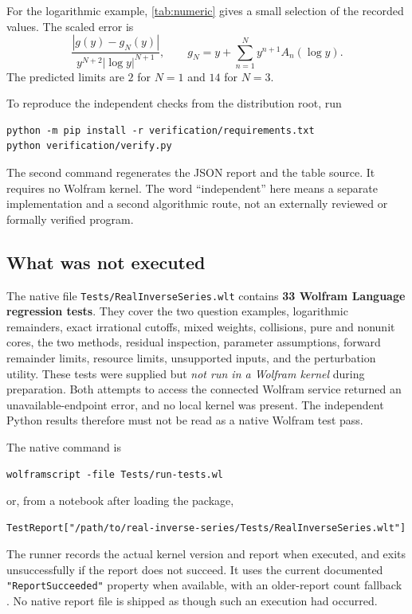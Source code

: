 \documentclass[11pt,a4paper]{article}
\numberwithin{equation}{section}
\theoremstyle{definition}
\newcommand{\code}[1]{\texttt{#1}}
\begin{document}
For the logarithmic example, \cref{tab:numeric} gives a small selection
of the recorded values. The scaled error is
\[
 \frac{|g(y)-g_N(y)|}{y^{N+2}|\log y|^{N+1}},
 \qquad g_N=y+\sum_{n=1}^N y^{n+1}A_n(\log y).
\]
The predicted limits are $2$ for $N=1$ and $14$ for $N=3$.
\begin{table}[htbp]
\centering

\caption{Measured inverse errors at 250-digit working precision.
The table is generated by the verification program from its recorded
numerical values; entries are rounded for display.}
\label{tab:numeric}
\end{table}

To reproduce the independent checks from the distribution root, run
\begin{lstlisting}
python -m pip install -r verification/requirements.txt
python verification/verify.py
\end{lstlisting}
The second command regenerates the JSON report and the table source.
It requires no Wolfram kernel. The word ``independent'' here means a
separate implementation and a second algorithmic route, not an externally
reviewed or formally verified program.

\subsection{What was not executed}
The native file \code{Tests/RealInverseSeries.wlt} contains
\textbf{33 Wolfram Language regression tests}. They cover the two
question examples, logarithmic remainders, exact irrational cutoffs,
mixed weights, collisions, pure and nonunit cores, the two methods,
residual inspection, parameter assumptions, forward remainder limits,
resource limits, unsupported inputs, and the perturbation utility.
These tests were supplied but \emph{not run in a Wolfram kernel} during
preparation. Both attempts to access the connected Wolfram service
returned an unavailable-endpoint error, and no local kernel was present.
The independent Python results therefore must not be read as a native
Wolfram test pass.

The native command is
\begin{lstlisting}
wolframscript -file Tests/run-tests.wl
\end{lstlisting}
or, from a notebook after loading the package,
\begin{lstlisting}
TestReport["/path/to/real-inverse-series/Tests/RealInverseSeries.wlt"]
\end{lstlisting}
The runner records the actual kernel version and report when executed,
and exits unsuccessfully if the report does not succeed. It uses the
current documented \code{"ReportSucceeded"} property when available,
with an older-report count fallback \cite{wl-tests}. No native report
file is shipped as though such an execution had occurred.
\end{document}
